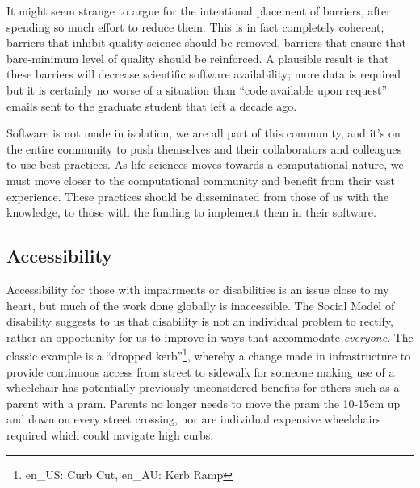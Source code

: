 It might seem strange to argue for the intentional placement of barriers, after spending so much effort to reduce them. This is in fact completely coherent; barriers that inhibit quality science should be removed, barriers that ensure that bare-minimum level of quality should be reinforced. A plausible result is that these barriers will decrease scientific software availability; more data is required but it is certainly no worse of a situation than ``code available upon request'' emails sent to the graduate student that left a decade ago.

Software is not made in isolation, we are all part of this community, and it's on the entire community to push themselves and their collaborators and colleagues to use best practices. As life sciences moves towards a computational nature, we must move closer to the computational community and benefit from their vast experience. These practices should be disseminated from those of us with the knowledge, to those with the funding to implement them in their software. %

\subsection{Accessibility}

Accessibility for those with impairments or disabilities is an issue close to my heart, but much of the work done globally is inaccessible. The Social Model\cite{Oliver_2013} of disability suggests to us that disability is not an individual problem to rectify, rather an opportunity for us to improve in ways that accommodate \emph{everyone}. The classic example is a ``dropped kerb''\footnote{en\_US: Curb Cut, en\_AU: Kerb Ramp}, whereby a change made in infrastructure to provide continuous access from street to sidewalk for someone making use of a wheelchair has potentially previously unconsidered benefits for others such as a parent with a pram. Parents no longer needs to move the pram the 10-15cm up and down on every street crossing, nor are individual expensive wheelchairs required which could navigate high curbs.

